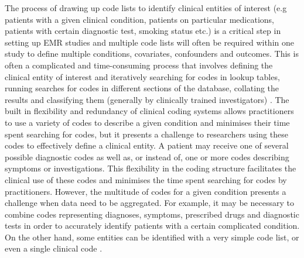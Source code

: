 \documentclass[10pt]{article}
\begin{document}
The process of drawing up code lists to identify clinical entities of interest (e.g patients with a given clinical condition, patients on particular medications, patients with certain diagnostic test, smoking status etc.) is a critical step in setting up EMR studies and multiple code lists will often be required within one study to define multiple conditions, covariates, confounders and outcomes.  This is often a complicated and time-consuming process that involves defining the clinical entity of interest and iteratively searching for codes in lookup tables, running searches for codes in different sections of the database, collating the results and classifying them (generally by clinically trained investigators) \cite{Dave2009, Nicholson2013}.  The built in flexibility and redundancy of clinical coding systems allows practitioners to use a variety of codes to describe a given condition and minimises their time spent searching for codes, but it presents a challenge to researchers using these codes to effectively define a clinical entity. A patient may receive one of several possible diagnostic codes as well as, or instead of, one or more codes describing symptoms or investigations. This flexibility in the coding structure facilitates the clinical use of these codes and minimises the time spent searching for codes by practitioners. However, the multitude of codes for a given condition presents a challenge when data need to be aggregated. For example, it may be necessary to combine codes representing diagnoses, symptoms, prescribed drugs and diagnostic tests in order to accurately identify patients with a certain complicated condition.  On the other hand, some entities can be identified with a very simple code list, or even a single clinical code \cite{Kotz2011}.
\end{document}
